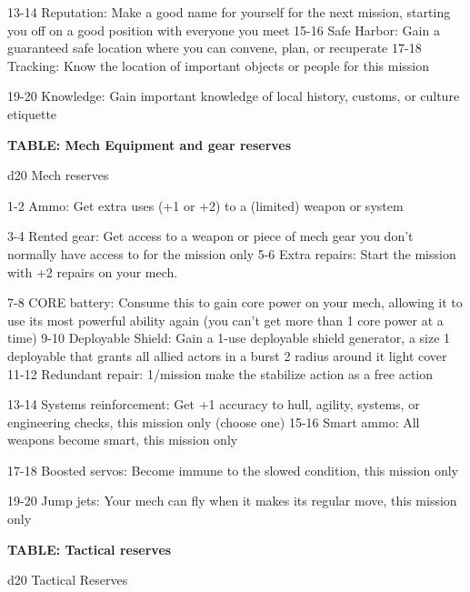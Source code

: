    13-14   Reputation: Make a good name for yourself for the next mission, starting you off on a
           good position with everyone you meet
   15-16   Safe Harbor: Gain a guaranteed safe location where you can convene, plan, or
           recuperate
   17-18   Tracking: Know the location of important objects or people for this mission

   19-20   Knowledge: Gain important knowledge of local history, customs, or culture etiquette

\textbf{TABLE: Mech Equipment and gear reserves}

 d20       Mech	reserves

  1-2      Ammo: Get extra uses (+1 or +2) to a (limited) weapon or system

  3-4      Rented gear: Get access to a weapon or piece of mech gear you don’t normally have
           access to for the mission only
  5-6      Extra repairs: Start the mission with +2 repairs on your mech.

  7-8      CORE battery: Consume this to gain core power on your mech, allowing it to use its
           most powerful ability again (you can’t get more than 1 core power at a time)
 9-10      Deployable Shield: Gain a 1-use deployable shield generator, a size 1 deployable that
           grants all allied actors in a burst 2 radius around it light cover
   11-12   Redundant repair: 1/mission make the stabilize action as a free action

   13-14   Systems reinforcement: Get +1 accuracy to hull, agility, systems, or engineering
           checks, this mission only (choose one)
   15-16   Smart ammo: All weapons become smart, this mission only

   17-18   Boosted servos: Become immune to the slowed condition, this mission only

   19-20   Jump jets: Your mech can fly when it makes its regular move, this mission only

\textbf{TABLE: Tactical reserves}

 d20       Tactical	Reserves

